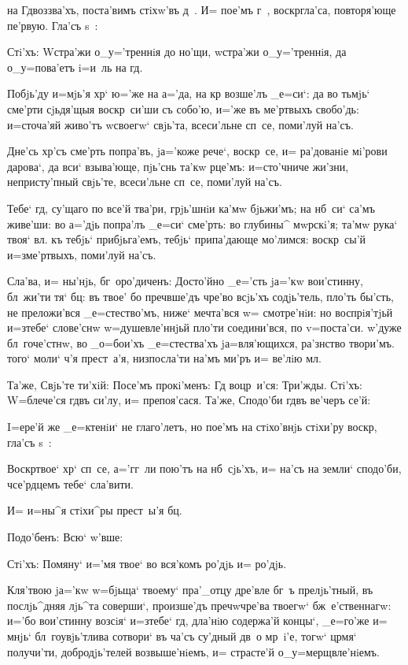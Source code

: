 
на Гд воззва'хъ, поста'вимъ стiхw'въ д~. И= пое'мъ 
г~, воскр гла'са, повторя'юще пе'рвую. Гла'съ s~:

Стi'хъ: W\т стра'жи о_у='треннiя до но'щи, w\т стра'жи 
о_у='треннiя, да о_у=пова'етъ i=и~ль на гд.

Побjь'ду и=мjь'я хр` ю='же на а='да, на кр 
возше'лъ _е=си`: да во тьмjь` сме'рти сjьдя'щыя 
воскр~си'ши съ собо'ю, и='же въ ме'ртвыхъ свобо'дь: 
и=сточа'яй живо'тъ w\т своегw` свjь'та, всеси'льне сп~се, 
поми'луй на'съ.

Дне'сь хр'съ сме'рть попра'въ, jа='коже рече`, 
воскр~се, и= ра'дованiе мi'рови дарова`, да вси` 
взыва'юще, пjь'снь та'кw рце'мъ: и=сто'чниче жи'зни, 
непристу'пный свjь'те, всеси'льне сп~се, поми'луй на'съ.

Тебе` гд, су'щаго по все'й тва'ри, грjь'шнiи ка'мw 
бjьжи'мъ; на нб~си` са'мъ живе'ши: во а='дjь попра'лъ 
_е=си` сме'рть: во глубины^ мwрскi'я; та'мw рука` твоя` 
вл. къ тебjь` прибjьга'емъ, тебjь` припа'дающе 
мо'лимся: воскр~сы'й и=з\ъ ме'ртвыхъ, поми'луй на'съ.

Сла'ва, и= ны'нjь, бг~оро'диченъ: Досто'йно _е='сть 
jа='кw вои'стинну, бл~жи'ти тя` бц: въ твое' бо 
преч вше'дъ чре'во всjь'хъ содjь'тель, пло'ть 
бы'сть, не преложи'вся _е=стество'мъ, ниже` мечта'вся w= 
смотре'нiи: но воспрiя'тjьй и=з\ъ тебе` слове'снw 
w=душевле'ннjьй пло'ти соедини'вся, по v=поста'си. 
w'дуже бл~гоче'стнw, во _о=бои'хъ _е=стества'хъ 
jа=вля'ющихся, ра'знство твори'мъ. того` моли` ч'я 
прест~а'я, низпосла'ти на'мъ ми'ръ и= ве'лiю мл.

Та'же, Свjь'те ти'хiй: Посе'мъ прокi'менъ: Гд 
воцр~и'ся: Три'жды. Стi'хъ: W=блече'ся гд въ си'лу, и= 
препоя'сася. Та'же, Сподо'би гд въ ве'черъ се'й: 

I=ере'й же _е=ктенiи` не глаго'летъ, но пое'мъ на 
стiхо'внjь стiхи'ру воскр, гла'съ s~:

Воскр твое` хр` сп~се, а='гг~ли пою'тъ на 
нб~сjь'хъ, и= на'съ на земли` сподо'би, ч се'рдцемъ 
тебе` сла'вити.

И= и=ны^я стiхи^ры прест~ы'я бц.

Подо'бенъ: Всю` w'вше:

Стi'хъ: Помяну` и='мя твое` во вся'комъ ро'дjь и= 
ро'дjь. 

Кля'твою jа='кw w=бjьща` твоему` пра'_отцу дре'вле 
бг~ъ прелjь'тный, въ послjь^дняя лjь^та соверши`, 
произше'дъ преч w\т чре'ва твоегw` бж~е'ственнагw: 
и='бо вои'стинну возсiя` и=з\ъ тебе` гд, дла'нiю 
содержа'й концы`, _е=го'же и= мнjь` бл~гоувjь'тлива 
сотвори` въ ча'съ су'дный дв~о мр~i'е, тогw` цр мя` 
получи'ти, добродjь'телей возвыше'нiемъ, и= страсте'й 
о_у=мерщвле'нiемъ.

